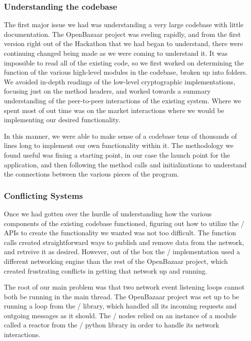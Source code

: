 \documentclass[12pt,twocolumn]{article}
\begin{document}
\subsubsection{Understanding the codebase}
The first major issue we had was understanding a very large codebase with little documentation. The OpenBazaar project was eveling rapidly, and from the first version right out of the Hackathon that we had began to understand, there were continuing changed being made as we were coming to understand it. It was impossible to read all of the existing code, so we first worked on determining the function of the various high-level modules in the codebase, broken up into folders. We avoided in-depth readings of the low-level cryptographic implementations, focusing just on the method headers, and worked towards a summary understanding of the peer-to-peer interactions of the existing system. Where we spent most of out time was on the market interactions where we would be implementing our desired functionality.

In this manner, we were able to make sense of a codebase tens of thousands of lines long to implement our own functionality within it. The methodology we found useful was fining a starting point, in our case the launch point for the application, and then following the method calls and initializations to understand the connections between the various pieces of the program.

\subsubsection{Conflicting Systems}
Once we had gotten over the hurdle of understanding how the various components of the existing codebase functioned, figuring out how to utilize the \Entangled/ APIs to create the functionality we wanted was not too difficult. The function calls created straightforward ways to publish and remove data from the network, and retreive it as desired. However, out of the box the \Entangled/ implementation used a different networking engine than the rest of the OpenBazaar project, which created frustrating conflicts in getting that network up and running.

The root of our main problem was that two network event listening loops cannot both be running in the main thread. The OpenBazaar project was set up to be running a loop from the \Tornado/ library, which handled all its incoming requests and outgoing messages as it should. The \Entangled/ nodes relied on an instance of a module called a {{\sc reactor}} from the \Twisted/ python library in order to handle its network interactions.
\end{document}
